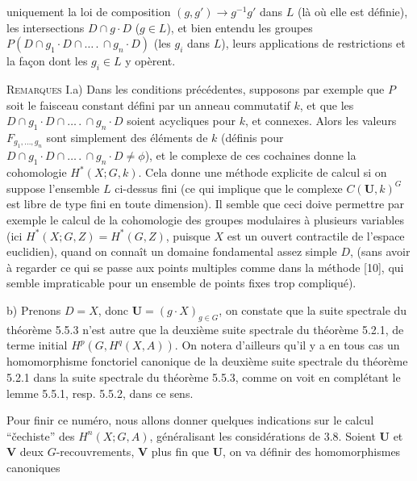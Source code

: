 \clearpage
{}

\noindent uniquement la loi de composition $(g,g')\to g^{-1}g'$ dans $L$
(là où elle est définie), les intersections $D\cap g\cdot D$ ($g\in L$), et
bien entendu les groupes
$P(D\cap g_1\cdot D\cap\ldots\,.\,\cap g_n\cdot D)$ (les $g_i$ dans $L$), leurs
applications de restrictions et la façon dont les $g_i\in L$ y opèrent.

\textsc{Remarques I.}\quad a) Dans les conditions précédentes,
supposons par exemple que $P$ soit le faisceau constant défini par un anneau
commutatif $k$, et que les
$D\cap g_1\cdot D\cap\ldots\,.\,\cap g_n\cdot D$ soient acycliques pour $k$, et
connexes. Alors les valeurs $F_{g_1,\ldots,g_n}$ sont simplement des éléments
de $k$ (définis pour
$D\cap g_1\cdot D\cap\ldots\,.\,\cap g_n\cdot D\ne\phi$), et le complexe de ces
cochaines donne la cohomologie $H^*(X;G,k)$. Cela donne une méthode explicite
de calcul si on suppose l'ensemble $L$ ci-dessus fini (ce qui implique que le
complexe $C({\mathbf U},k)^G$ est libre de type fini en toute dimension). Il
semble que ceci doive permettre par exemple le calcul de la cohomologie des
groupes modulaires à plusieurs variables (ici
$H^*(X;G,Z)=H^*(G,Z)$, puisque $X$ est un ouvert contractile de
l'espace euclidien), quand on connaît un domaine fondamental assez simple $D$,
(sans avoir à regarder ce qui se passe aux points multiples comme dans la
méthode [10], qui semble impraticable pour un ensemble de points fixes trop
compliqué).

b) Prenons $D=X$, donc ${\mathbf U}=(g\cdot X)_{g\in G}$, on constate que la
suite spectrale du théorème 5.5.3 n'est autre que la deuxième suite spectrale du
théorème 5.2.1, de terme initial $H^p(G,H^q(X,A))$. On notera d'ailleurs qu'il
y a en tous cas un homomorphisme fonctoriel canonique de la deuxième suite spectrale du
théorème 5.2.1 dans la suite spectrale du théorème 5.5.3, comme on
voit en complétant le lemme 5.5.1, resp. 5.5.2, dans ce sens.

Pour finir ce numéro, nous allons donner quelques indications sur le calcul
``\v{c}echiste'' des $H^n(X;G,A)$, généralisant les considérations de 3.8. Soient
${\mathbf U}$ et ${\mathbf V}$ deux $G$-recouvrements, ${\mathbf V}$ plus fin que
${\mathbf U}$, on va définir des homomorphismes canoniques

